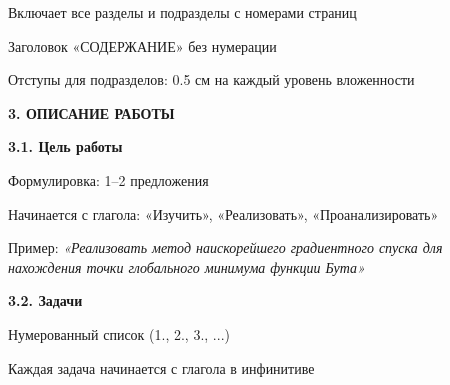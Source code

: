 \documentclass{article}%
\begin{document}
\begin{flushleft}%
Включает все разделы и подразделы с номерами страниц%
%
\end{flushleft}%
\begin{flushleft}%
Заголовок «СОДЕРЖАНИЕ» без нумерации%
%
\end{flushleft}%
\begin{flushleft}%
Отступы для подразделов: 0.5 см на каждый уровень вложенности%
%
\end{flushleft}%
\begin{flushleft}%
\textbf{3. ОПИСАНИЕ РАБОТЫ}%
%
\end{flushleft}%
\begin{flushleft}%
\textbf{3.1. Цель работы}%
%
\end{flushleft}%
\begin{flushleft}%
Формулировка: 1–2 предложения%
%
\end{flushleft}%
\begin{flushleft}%
Начинается с глагола: «Изучить», «Реализовать», «Проанализировать»%
%
\end{flushleft}%
\begin{flushleft}%
Пример: %
\textit{«Реализовать метод наискорейшего градиентного спуска для нахождения точки глобального минимума функции Бута»}%
%
\end{flushleft}%
\begin{flushleft}%
\textbf{3.2. Задачи}%
%
\end{flushleft}%
\begin{flushleft}%
Нумерованный список (1., 2., 3., ...)%
%
\end{flushleft}%
\begin{flushleft}%
Каждая задача начинается с глагола в инфинитиве%
%
\end{flushleft}%
\end{document}

